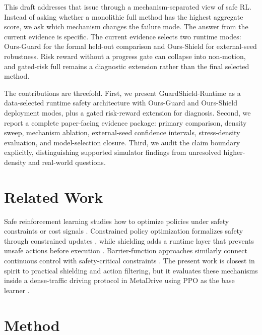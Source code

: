 \documentclass[conference,a4paper]{IEEEtran}
\newcommand{\method}{GuardShield-Runtime}
\begin{document}
This draft addresses that issue through a mechanism-separated view of safe RL. Instead of asking whether a monolithic full method has the highest aggregate score, we ask which mechanism changes the failure mode. The answer from the current evidence is specific. The current evidence selects two runtime modes: Ours-Guard for the formal held-out comparison and Ours-Shield for external-seed robustness. Risk reward without a progress gate can collapse into non-motion, and gated-risk full remains a diagnostic extension rather than the final selected method.

The contributions are threefold. First, we present \method{} as a data-selected runtime safety architecture with Ours-Guard and Ours-Shield deployment modes, plus a gated risk-reward extension for diagnosis. Second, we report a complete paper-facing evidence package: primary comparison, density sweep, mechanism ablation, external-seed confidence intervals, stress-density evaluation, and model-selection closure. Third, we audit the claim boundary explicitly, distinguishing supported simulator findings from unresolved higher-density and real-world questions.
\section{Related Work}
Safe reinforcement learning studies how to optimize policies under safety constraints or cost signals \cite{garcia2015safe,sutton2018reinforcement}. Constrained policy optimization formalizes safety through constrained updates \cite{achiam2017cpo}, while shielding adds a runtime layer that prevents unsafe actions before execution \cite{alshiekh2018safe}. Barrier-function approaches similarly connect continuous control with safety-critical constraints \cite{cheng2019end}. The present work is closest in spirit to practical shielding and action filtering, but it evaluates these mechanisms inside a dense-traffic driving protocol in MetaDrive \cite{li2022metadrive} using PPO as the base learner \cite{schulman2017ppo}.
\section{Method}
\end{document}
